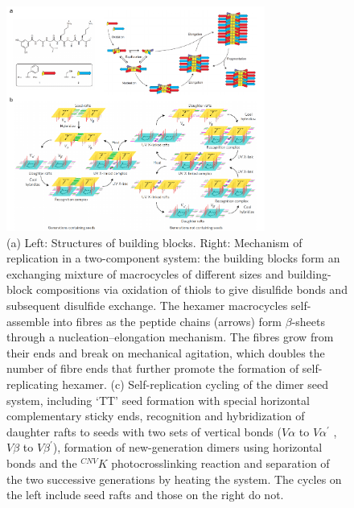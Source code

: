 \begin{appendices}
\begin{figure}[h]
    \centering
    \includegraphics[width=8.5cm]{figures/A5_MakingCopies2.pdf}
    \caption{(a) Left: Structures of building blocks. Right: Mechanism of replication in a two-component system: the building blocks form an exchanging mixture of macrocycles of different sizes and building-block compositions via oxidation of thiols to give disulfide bonds and subsequent disulfide exchange. The hexamer macrocycles self-assemble into fibres as the peptide chains (arrows) form $\beta$-sheets through a nucleation–elongation mechanism. The fibres grow from their ends and break on mechanical agitation, which doubles the number of fibre ends that further promote the formation of self-replicating hexamer.  (c) Self-replication cycling of the dimer seed system, including ‘TT’ seed formation with special horizontal complementary sticky ends, recognition and hybridization of daughter rafts to seeds with two sets of vertical bonds ($V\alpha$ to $V\alpha^{'}$ , $V\beta$ to $V\beta^{'}$), formation of new-generation dimers using horizontal bonds and the $^{CNV} K$ photocrosslinking reaction and separation of the two successive generations by heating the system. The cycles on the left include seed rafts and those on the right do not.   }
    \label{fig:MakingCopies2}
\end{figure}


\end{appendices}
